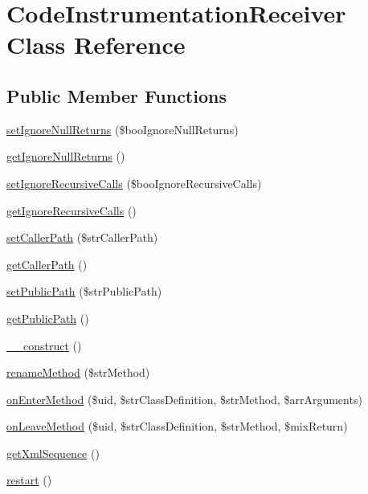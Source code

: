 \hypertarget{class_code_instrumentation_receiver}{
\section{CodeInstrumentationReceiver Class Reference}
\label{class_code_instrumentation_receiver}
}
\subsection*{Public Member Functions}
\begin{CompactItemize}
\item 
\hyperlink{class_code_instrumentation_receiver_6d6ba9a97475d3f300ec905ef3fc6d7a}{setIgnoreNullReturns} (\$booIgnoreNullReturns)
\item 
\hyperlink{class_code_instrumentation_receiver_659ec50b656faab0ff518cce0cbe1a43}{getIgnoreNullReturns} ()
\item 
\hyperlink{class_code_instrumentation_receiver_d9b3988e912a93b15037235ee4150e5a}{setIgnoreRecursiveCalls} (\$booIgnoreRecursiveCalls)
\item 
\hyperlink{class_code_instrumentation_receiver_f5d40f3016b4d1b289a089b24eebbbe5}{getIgnoreRecursiveCalls} ()
\item 
\hyperlink{class_code_instrumentation_receiver_187013c79a78480d90269bd6e66c6772}{setCallerPath} (\$strCallerPath)
\item 
\hyperlink{class_code_instrumentation_receiver_8e5e85fb7a58ef069788033b05ba0004}{getCallerPath} ()
\item 
\hyperlink{class_code_instrumentation_receiver_5a1555be1d4979c83dbdbacdfc31c679}{setPublicPath} (\$strPublicPath)
\item 
\hyperlink{class_code_instrumentation_receiver_7eceb6a70b026359b2428df86b7e1d5d}{getPublicPath} ()
\item 
\hyperlink{class_code_instrumentation_receiver_118198dd8eaf3a12e3bbc407a92a3376}{\_\-\_\-construct} ()
\item 
\hyperlink{class_code_instrumentation_receiver_f103bccb49a8e11c8da7d4a12bee14cc}{renameMethod} (\$strMethod)
\item 
\hyperlink{class_code_instrumentation_receiver_51bfc5d088d4cf97f850a64cc9b76944}{onEnterMethod} (\$uid, \$strClassDefinition, \$strMethod, \$arrArguments)
\item 
\hyperlink{class_code_instrumentation_receiver_dbe8202a28014f81a7c18f59f557fadc}{onLeaveMethod} (\$uid, \$strClassDefinition, \$strMethod, \$mixReturn)
\item 
\hyperlink{class_code_instrumentation_receiver_addf964fe411ef0c9d4caa4745d22a31}{getXmlSequence} ()
\item 
\hyperlink{class_code_instrumentation_receiver_7f475c5ce6f32c9ab0aac748646deaa8}{restart} ()
\end{CompactItemize}
